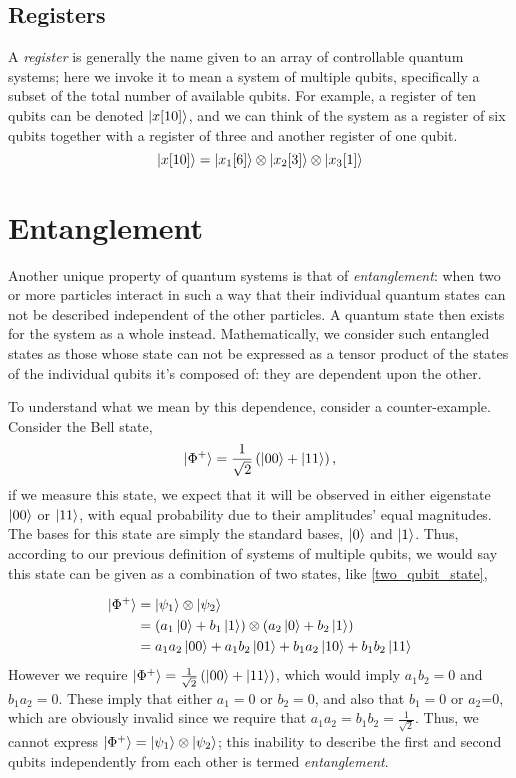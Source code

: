\subsection{Registers}
A \textit{register} is generally the name given to an array of controllable quantum systems; here we invoke it to mean a system of multiple qubits, specifically a subset of the total number of available qubits. 
For example, a register of ten qubits can be denoted $\ket{x[10]}$, and we can think of the system as a register of six qubits together with a register of three and another register of one qubit. 
$$ \ket{x[10]} = \ket{x_1[6]} \otimes \ket{x_2[3]} \otimes \ket{x_3[1]} $$


\section{Entanglement}\label{sec:entanglement}
Another unique property of quantum systems is that of \emph{entanglement}: 
    when two or more particles interact in such a way that their individual quantum states can not be described independent of the other particles. 
A quantum state then exists for the system as a whole instead. 
Mathematically, we consider such entangled states as those whose state can not be expressed as a tensor product of the states of the individual qubits it's composed of: they are dependent upon the other. 
\par
To understand what we mean by this dependence, consider a counter-example. 
Consider the Bell state,
\begin{equation}
    \ket{\Phi^{+}} = \frac{1}{\sqrt{2}} \left( \ket{00} + \ket{11} \right),
\end{equation}
if we measure this state, we expect that it will be observed in either eigenstate $\ket{00} $ or $ \ket{11}$, 
    with equal probability due to their amplitudes' equal magnitudes. 
The bases for this state are simply the standard bases, $\ket{0}$ and $\ket{1}$. 
Thus, according to our previous definition of systems of multiple qubits, we would say this state can be given as a combination of two states, like \cref{two_qubit_state}, 

\begin{equation}
    \begin{split}
        \ket{\Phi^{+}} &= \ket{\psi_1} \otimes \ket{\psi_2} 
        \\ &=  \left( a_1 \ket{0} + b_1 \ket{1} \right) \otimes \left( a_2 \ket{0} + b_2 \ket{1} \right)
        \\ &= a_1a_2 \ket{00} + a_1b_2 \ket{01} + b_1a_2 \ket{10} + b_1b_2\ket{11} 
    \end{split}
\end{equation}
However we require $\ket{\Phi^{+}} = \frac{1}{\sqrt{2}} \left( \ket{00} + \ket{11} \right) $, 
    which would imply $a_1b_2 = 0$ and $b_1a_2 = 0$. 
These imply that either $a_1 =0$ or $b_2=0$, and also that $b_1=0$ or $a_2$=0, which are obviously invalid since we require that $a_1a_2 = b_1b_2 = \frac{1}{\sqrt{2}} $. 
Thus, we cannot express $ |\Phi^+ \rangle=  \ket{\psi_1} \otimes \ket{\psi_2} $;
    this inability to describe the first and second qubits independently from each other is termed \emph{entanglement}. 

